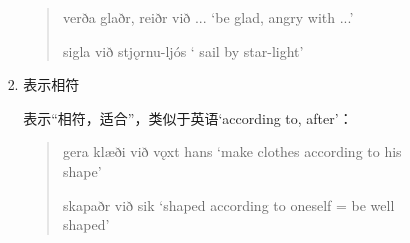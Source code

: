 \begin{enumerate}[itemindent=1em, label=\textbf{\arabic*}.]
\begin{enumerate}
\begin{enumerate}
\begin{enumerate}
\begin{quote}
                                            verða glaðr, reiðr við ... `be glad, angry with ...'

                                            sigla við stj\k{o}rnu-ljós ` sail by star-light'
                                        \end{quote}

                                  \item 表示相符

                                        表示“相符，适合”，类似于英语`according to, after'：
                                        \begin{quote}
                                            gera klæði við v\k{o}xt hans `make clothes according to his shape'

                                            skapaðr við sik `shaped according to oneself = be well shaped'
                                        \end{quote}
                              \end{enumerate}
                    \end{enumerate}
          \end{enumerate}
\end{enumerate}

